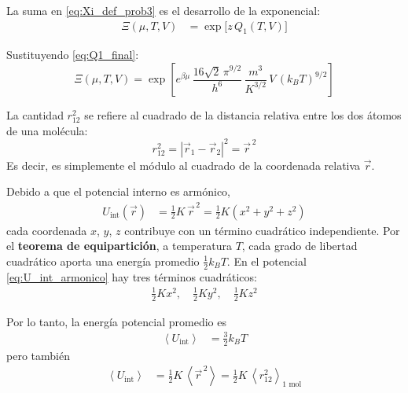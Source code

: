 \documentclass{article}
\begin{document}
La suma en \eqref{eq:Xi_def_prob3} es el desarrollo de la exponencial:
\begin{equation}
\begin{split}
\Xi(\mu,T,V)
&= \exp\!\big[z\,Q_{1}(T,V)\big]
\end{split}\label{eq:Xi_exp_paso}
\end{equation}

Sustituyendo \eqref{eq:Q1_final}:
\begin{equation}
\boxed{
\Xi(\mu,T,V)
= \exp\!\left[
e^{\beta\mu}\,
\frac{16\sqrt{2}\,\pi^{9/2}}{h^{6}}
\,\frac{m^{3}}{K^{3/2}}\,
V\,(k_{B}T)^{9/2}
\right]
}
\label{eq:Xi_final_prob3}
\end{equation}


La cantidad \(r_{12}^{2}\) se refiere al cuadrado de la distancia relativa entre
los dos átomos de una molécula:
\[
r_{12}^{2} = |\vec r_{1} - \vec r_{2}|^{2} = \vec r^{\,2}
\]
Es decir, es simplemente el módulo al cuadrado de la coordenada relativa \(\vec r\).

Debido a que el potencial interno es armónico,
\begin{equation}
\begin{split}
U_{\text{int}}(\vec r)
&= \frac{1}{2}K\,\vec r^{\,2}
= \frac{1}{2}K(x^{2}+y^{2}+z^{2})
\end{split}\label{eq:U_int_armonico}
\end{equation}
cada coordenada \(x\), \(y\), \(z\) contribuye con un término cuadrático independiente.
Por el \textcolor{Lochinvar}{\textbf{teorema de equipartición}}, a temperatura \(T\),
cada grado de libertad cuadrático aporta una energía promedio
\(\frac{1}{2}k_{B}T\). En el potencial \eqref{eq:U_int_armonico} hay tres términos
cuadráticos:
\begin{equation}
\begin{split}
\frac{1}{2}Kx^{2},\quad
\frac{1}{2}Ky^{2},\quad
\frac{1}{2}Kz^{2}
\end{split}\label{eq:terminos_cuadraticos}
\end{equation}

Por lo tanto, la energía potencial promedio es
\begin{equation}
\begin{split}
\left\langle U_{\text{int}}\right\rangle
&= \frac{3}{2}k_{B}T
\end{split}\label{eq:U_int_promedio}
\end{equation}
pero también
\begin{equation}
\begin{split}
\left\langle U_{\text{int}}\right\rangle
&= \frac{1}{2}K\,\left\langle \vec r^{\,2}\right\rangle
= \frac{1}{2}K\,\left\langle r_{12}^{2}\right\rangle_{\text{1 mol}}
\end{split}\label{eq:U_int_en_r2}
\end{equation}
\end{document}
